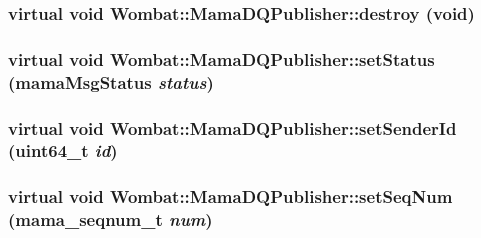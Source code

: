 \hypertarget{classWombat_1_1MamaDQPublisher_ab67727cbb5bfc1320ac113bcee66b6f0}{
\subsubsection[{destroy}]{\setlength{\rightskip}{0pt plus 5cm}virtual void Wombat::MamaDQPublisher::destroy (void)}}
\label{classWombat_1_1MamaDQPublisher_ab67727cbb5bfc1320ac113bcee66b6f0}
\hypertarget{classWombat_1_1MamaDQPublisher_ad6e224a971b37aa1bf9c96136ade2278}{
\subsubsection[{setStatus}]{\setlength{\rightskip}{0pt plus 5cm}virtual void Wombat::MamaDQPublisher::setStatus (mamaMsgStatus {\em status})}}
\label{classWombat_1_1MamaDQPublisher_ad6e224a971b37aa1bf9c96136ade2278}
\hypertarget{classWombat_1_1MamaDQPublisher_a29822832694ee1dc2211c91712082eed}{
\subsubsection[{setSenderId}]{\setlength{\rightskip}{0pt plus 5cm}virtual void Wombat::MamaDQPublisher::setSenderId (uint64\_\-t {\em id})}}
\label{classWombat_1_1MamaDQPublisher_a29822832694ee1dc2211c91712082eed}
\hypertarget{classWombat_1_1MamaDQPublisher_af4e8c027f5c0655920be2aa7bccad41e}{
\subsubsection[{setSeqNum}]{\setlength{\rightskip}{0pt plus 5cm}virtual void Wombat::MamaDQPublisher::setSeqNum (mama\_\-seqnum\_\-t {\em num})}}
